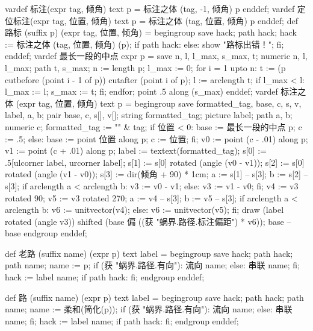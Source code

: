 \startMPinclusions[+]
vardef 标注(expr tag, 倾角) text p =
  标注之体 (tag, -1, 倾角) p
enddef;
vardef 定位标注(expr tag, 位置, 倾角) text p =
  标注之体 (tag, 位置, 倾角) p
enddef;
def 路标 (suffix p) (expr tag, 位置, 倾角) =
  begingroup
    save hack; path hack;
    hack := 标注之体 (tag, 位置, 倾角) (p);
    if path hack:
    else:
      show "路标出错！";
    fi;
enddef;
vardef 最长一段的中点 expr p =
  save n, l, l_max, s_max, t;
  numeric n, l, l_max; path t, s_max;
  n := length p;
  l_max := 0;
  for i = 1 upto n:
    t := (p cutbefore (point i - 1 of p)) cutafter (point i of p);
    l := arclength t;
    if l_max < l:
      l_max := l; s_max := t;
    fi;
  endfor;
  point .5 along (s_max)
enddef;
vardef 标注之体 (expr tag, 位置, 倾角) text p =
  begingroup
    save formatted_tag, base, c, s, v, label, a, b;
    pair base, c, s[], v[]; string formatted_tag; picture label; path a, b; numeric c;
    formatted_tag := "\tfx" & tag;
    if 位置 < 0:
      base := 最长一段的中点 p;
      c := .5;
    else:
      base := point 位置 along p;
      c := 位置;
    fi;
    v0 := point (c - .01) along p;
    v1 := point (c + .01) along p;
    label := textext(formatted_tag);
    s[0] := .5[ulcorner label, urcorner label];
    s[1] := s[0] rotated (angle (v0 - v1));
    s[2] := s[0] rotated (angle (v1 - v0));
    s[3] := dir(倾角 + 90) * 1cm; %
    a := s[1] -- s[3];
    b := s[2] -- s[3];
    if arclength a < arclength b:
      v3 := v0 - v1;
    else:
      v3 := v1 - v0;
    fi;
    v4 := v3 rotated 90;
    v5 := v3 rotated 270;
    a := v4 -- s[3];
    b := v5 -- s[3];
    if arclength a < arclength b:
      v6 := unitvector(v4);
    else:
      v6 := unitvector(v5);
    fi;
    draw (label rotated (angle v3)) shifted (base 偏 ((获 "蜗界.路径.标注偏距") * v6));
    base -- base
  endgroup
enddef;
\stopMPinclusions

\startMPinclusions[+]
def 老路 (suffix name) (expr p) text label =
  begingroup
  save hack; path hack;
  path name; name := p;
  if (获 "蜗界.路径.有向"):
    流向 name;
  else:
    串联 name;
  fi;
  hack := label name;
  if path hack: fi;
  endgroup
enddef;

def 路 (suffix name) (expr p) text label =
  begingroup
  save hack; path hack;
  path name; name := 柔和(简化(p));
  if (获 "蜗界.路径.有向"):
    流向 name;
  else:
    串联 name;
  fi;
  hack := label name; %
  if path hack: fi;
  endgroup
enddef;
\stopMPinclusions

